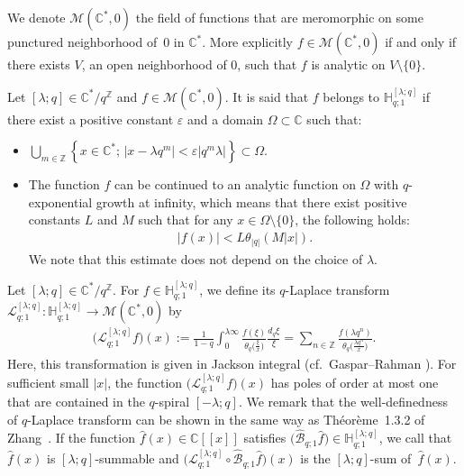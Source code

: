 \documentclass[11pt]{article}
\numberwithin{equation}{section}
\begin{document}
We denote $\mathcal{M}(\mathbb{C}^*,0)$ the field of functions that are meromorphic on some punctured neigh\-borhood of~0 in $\mathbb{C}^*$. More explicitly $f\in\mathcal{M}(\mathbb{C}^*,0)$ if and only if there exists $V$, an open neighborhood of 0, such that $f$ is analytic on $V\setminus\{0\}$.

Let $[\lambda;q]\in\mathbb{C}^*/q^\mathbb{Z}$ and $f\in\mathcal{M}(\mathbb{C}^*,0)$. It is said that $f$ belongs to $\mathbb{H}_{q;1}^{[\lambda;q]}$ if there exist a positive constant $\varepsilon$ and a domain $\Omega\subset\mathbb{C}$ such that:
\begin{itemize}\itemsep=0pt
\item $\displaystyle\bigcup_{m\in\mathbb{Z}}\left\{x\in\mathbb{C}^* ;\,\left|x-\lambda q^m\right|<\varepsilon\left|q^m\lambda\right|\right\}\subset\Omega$.
\item The function $f$ can be continued to an analytic function on $\Omega$ with $q$-exponential growth at infinity, which means that there exist positive constants $L$ and $M$ such that for any $x\in\Omega\setminus\{0\}$, the following holds:
\begin{gather*}
|f(x)|<L\theta_{|q|}(M|x|).
\end{gather*}
We note that this estimate does not depend on the choice of $\lambda$.
\end{itemize}

Let $[\lambda;q]\in\mathbb{C}^*/q^{\mathbb{Z}}$. For $f\in\mathbb{H}_{q;1}^{[\lambda;q]}$, we define its $q$-Laplace transform $\mathcal{L}_{q;1}^{[\lambda;q]}\colon \mathbb{H}_{q;1}^{[\lambda;q]}\to\mathcal{M}(\mathbb{C}^*,0)$ by
\begin{gather*}
\big(\mathcal{L}_{q;1}^{[\lambda;q]}f\big)(x):=\frac{1}{1-q}\int_{0}^{\lambda\infty}\frac{f(\xi)}{\theta_q\big(\frac{\xi}{x}\big)}\frac{d_q\xi}{\xi}=\sum_{n\in\mathbb{Z}}\frac{f(\lambda q^n)}{\theta_q\big(\frac{\lambda q^n}{x}\big)}.
\end{gather*}
Here, this transformation is given in Jackson integral (cf.\ Gaspar--Rahman \cite[Section~1.10]{Gasper&Rahman2004}). For sufficient small $|x|$, the function $\big(\mathcal{L}_{q;1}^{[\lambda;q]}f\big)(x)$ has poles of order at most one that are contained in the $q$-spiral $[-\lambda;q]$. We remark that the well-definedness of $q$-Laplace transform can be shown in the same way as Th\'eor\`eme~1.3.2 of Zhang~\cite{Zhang2002}. If the function $\hat{f}(x)\in\mathbb{C}[[x]]$ satisfies $\big(\hat{\mathcal{B}}_{q;1}\hat{f}\big)\in\mathbb{H}_{q;1}^{[\lambda;q]}$, we call that $\hat{f}(x)$ is $[\lambda;q]$-summable and $\big(\mathcal{L}_{q;1}^{[\lambda;q]}\circ\hat{\mathcal{B}}_{q;1}\hat{f}\big)(x)$ is the $[\lambda;q]$-sum of~$\hat{f}(x)$.
\end{document}
